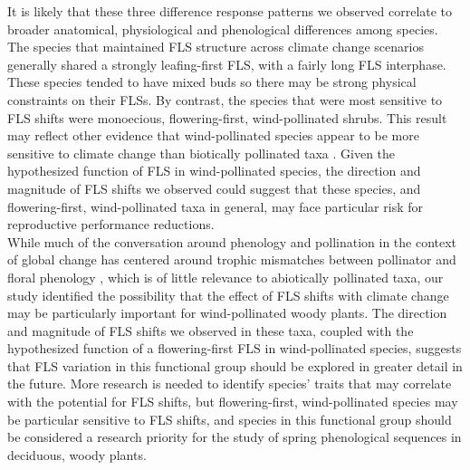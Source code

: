 \documentclass[11pt]{article}
\begin{document}
\noindent It is likely that these three difference response patterns we observed correlate to broader anatomical, physiological and phenological differences among species. The species that maintained FLS structure across climate change scenarios generally shared a strongly leafing-first FLS, with a fairly long FLS interphase. These species tended to have mixed buds so there may be strong physical constraints on their FLSs. By contrast, the species that were most sensitive to FLS shifts were monoecious, flowering-first, wind-pollinated shrubs. This result may reflect other evidence that wind-pollinated species appear to be more sensitive to climate change than biotically pollinated taxa \citep{Ziello:2012aa}. Given the hypothesized function of FLS in wind-pollinated species, the direction and magnitude of FLS shifts we observed could suggest that these species, and flowering-first, wind-pollinated taxa in general, may face particular risk for reproductive performance reductions.\\

\noindent While much of the conversation around phenology and pollination in the context of global change has centered around trophic mismatches between pollinator and floral phenology \citep{Memmott2007}, which is of little relevance to abiotically pollinated taxa, our study identified the possibility that the effect of FLS shifts with climate change may be particularly important for wind-pollinated woody plants. The direction and magnitude of FLS shifts we observed in these taxa, coupled with the hypothesized function of a flowering-first FLS in wind-pollinated species, suggests that FLS variation in this functional group should be explored in greater detail in the future. More research is needed to identify species' traits that may correlate with the potential for FLS shifts, but flowering-first, wind-pollinated species may be particular sensitive to FLS shifts, and species in this functional group should be considered a research priority for the study of spring phenological sequences in deciduous, woody plants. 

\end{document}
